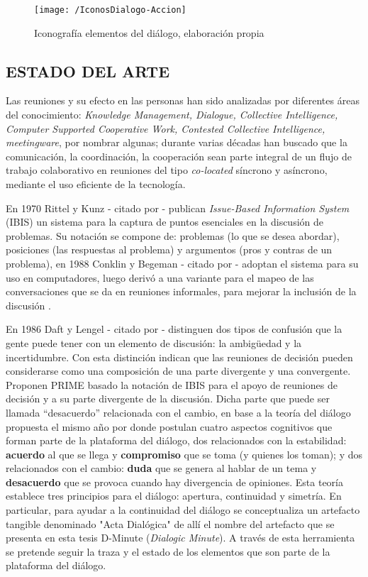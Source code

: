 \begin{figure}[h]
\centering
\texttt{[image: /IconosDialogo-Accion]}
\caption{Iconografía elementos del diálogo, elaboración propia} 
\label{img2-3}
\end{figure}

\subsection{ESTADO DEL ARTE}

Las reuniones y su efecto en las personas han sido analizadas por diferentes áreas del conocimiento: \textit{Knowledge Management, Dialogue, Collective Intelligence, Computer Supported Cooperative Work, Contested Collective Intelligence, meetingware}, por nombrar algunas; durante varias décadas han buscado que la comunicación, la coordinación, la cooperación sean parte integral de un flujo de trabajo colaborativo en reuniones del tipo \textit{co-located} síncrono y asíncrono, mediante el uso eficiente de la tecnología.

En 1970 Rittel y Kunz - citado por  - publican \textit{Issue-Based Information System} (IBIS) un sistema para la captura de puntos esenciales en la discusión de problemas. Su notación se compone de: problemas (lo que se desea abordar), posiciones (las respuestas al problema) y argumentos (pros y contras de un problema), en 1988 Conklin y Begeman - citado por  - adoptan el sistema para su uso en computadores, luego derivó a una variante para el mapeo de las conversaciones que se da en reuniones informales, para mejorar la inclusión de la discusión .

En 1986 Daft y Lengel - citado por  - distinguen dos tipos de confusión que la gente puede tener con un elemento de discusión: la ambig\"uedad y la incertidumbre. Con esta distinción  indican que las reuniones de decisión pueden considerarse como una composición de una parte divergente y una convergente. Proponen PRIME basado la notación de IBIS para el apoyo de reuniones de decisión y a su parte divergente de la discusión. Dicha parte que puede ser llamada “desacuerdo” relacionada con el cambio, en base a la teoría del diálogo propuesta el mismo año por  donde postulan cuatro aspectos cognitivos que forman parte de la plataforma del diálogo, dos relacionados con la estabilidad: \textbf{acuerdo} al que se llega y \textbf{compromiso} que se toma (y quienes los toman); y dos relacionados con el cambio: \textbf{duda} que se genera al hablar de un tema y \textbf{desacuerdo} que se provoca cuando hay divergencia de opiniones. Esta teoría establece tres principios para el diálogo: apertura, continuidad y simetría. En particular, para ayudar a la continuidad del diálogo se conceptualiza un artefacto tangible denominado "Acta Dialógica" de allí el nombre del artefacto que se presenta en esta tesis D-Minute (\textit{Dialogic Minute}). A través de esta herramienta se pretende seguir la traza y el estado de los elementos que son parte de la plataforma del diálogo.

